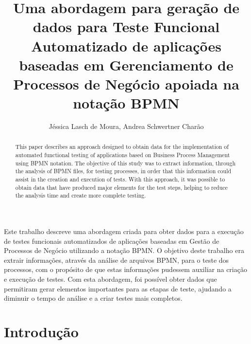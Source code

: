 \documentclass[12pt]{article}
\title{Uma abordagem para geração de dados para Teste Funcional Automatizado de aplicações baseadas em Gerenciamento de Processos de Negócio apoiada na notação BPMN}
\author{Jéssica Lasch de Moura\inst{1}, Andrea Schwertner Charão\inst{1}}
\begin{document}
 

\maketitle

\begin{abstract}

This paper describes an approach designed to obtain data for the implementation of automated functional testing of applications based on Business Process Management using BPMN notation. The objective of this study was to extract information, through the analysis of BPMN files, for testing processes, in order that this information could assist in the creation and execution of tests. With this approach, it was possible to obtain data that have produced major elements for the test steps, helping to reduce the analysis time and create more complete testing.
\end{abstract}
     
\begin{resumo} 

Este trabalho descreve uma abordagem criada para obter dados para a execução de testes funcionais automatizados de aplicações baseadas em Gestão de Processos de Negócio utilizando a notação BPMN. O objetivo deste trabalho era extrair informações, através da análise de arquivos BPMN, para o teste dos processos, com o propósito de que estas informações pudessem auxiliar na criação e execução de testes. Com esta abordagem, foi possível obter dados que permitiram gerar elementos importantes para as etapas de teste, ajudando a diminuir o tempo de análise e a criar testes mais completos.

\end{resumo}

\section{Introdução}
\end{document}
